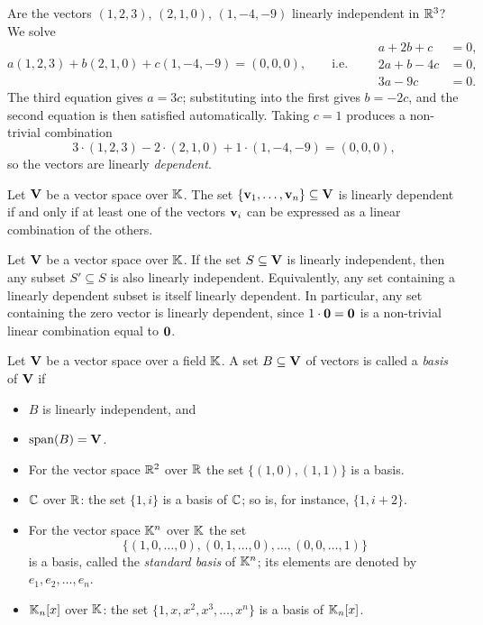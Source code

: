 \begin{example}
Are the vectors $(1,2,3)$, $(2,1,0)$, $(1,-4,-9)$ linearly independent in $\mathbb{R}^3$? We solve
\[
a(1,2,3)+b(2,1,0)+c(1,-4,-9) = (0,0,0), \qquad\text{i.e.}\qquad
\begin{aligned}
a+2b+c &= 0,\\ 2a+b-4c &= 0,\\ 3a-9c &= 0.
\end{aligned}
\]
The third equation gives $a = 3c$; substituting into the first gives $b = -2c$, and the second equation is
then satisfied automatically. Taking $c = 1$ produces a non-trivial combination
\[
3\cdot(1,2,3) - 2\cdot (2,1,0) + 1\cdot (1,-4,-9) = (0,0,0),
\]
so the vectors are linearly \emph{dependent}.
\end{example}

\begin{fact}
Let $\mathbf{V}$ be a vector space over $\mathbb{K}$. The set $\{\mathbf{v}_1,\ldots, \mathbf{v}_n\}\subseteq \mathbf{V}$ is linearly dependent if and
only if at least one of the vectors $\mathbf{v}_i$ can be expressed as a linear combination of the others.
\end{fact}

\begin{fact}
Let $\mathbf{V}$ be a vector space over $\mathbb{K}$. If the set $S\subseteq\mathbf{V}$ is linearly independent, then any subset
$S'\subseteq S$ is also linearly independent. Equivalently, any set containing a linearly dependent subset
is itself linearly dependent. In particular, any set containing the zero vector is linearly dependent,
since $1\cdot\mathbf{0} = \mathbf{0}$ is a non-trivial linear combination equal to $\mathbf{0}$.
\end{fact}

\begin{definition}
Let $\mathbf{V}$ be a vector space over a field $\mathbb{K}$. A set $B\subseteq \mathbf{V}$ of vectors is called a \emph{basis} of $\mathbf{V}$ if
\begin{itemize}
\item $B$ is linearly independent, and
\item $\operatorname{span}\!\left(B\right) = \mathbf{V}$.
\end{itemize}
\end{definition}

\begin{example}
\hfill
\begin{itemize}
\item For the vector space $\mathbb{R}^2$ over $\mathbb{R}$ the set $\{(1,0),(1,1)\}$ is a basis.
\item $\mathbb{C}$ over $\mathbb{R}$: the set $\{1,i\}$ is a basis of $\mathbb{C}$; so is, for instance, $\{1,i+2\}$.
\item For the vector space $\mathbb{K}^n$ over $\mathbb{K}$ the set
\[
\{(1,0,\ldots,0),(0,1,\ldots,0),\ldots,(0,0,\ldots,1)\}
\]
is a basis, called the \emph{standard basis} of $\mathbb{K}^n$; its elements are denoted by $e_1,e_2,\ldots,e_n$.
\item $\mathbb{K}_n[x]$ over $\mathbb{K}$: the set $\{1,x,x^2,x^3,\ldots, x^n\}$ is a basis of $\mathbb{K}_n[x]$.
\end{itemize}
\end{example}

